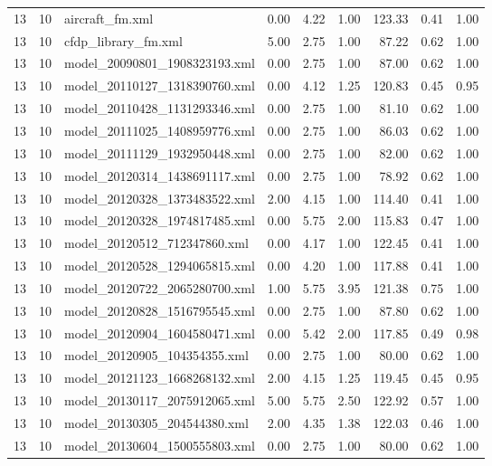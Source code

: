 \begin{table}[ht]
\begin{tabular}{rrlrrrrrr}
   13 &  10 & aircraft\_fm.xml & 0.00 & 4.22 & 1.00 & 123.33 & 0.41 & 1.00 \\ 
   13 &  10 & cfdp\_library\_fm.xml & 5.00 & 2.75 & 1.00 & 87.22 & 0.62 & 1.00 \\ 
   13 &  10 & model\_20090801\_1908323193.xml & 0.00 & 2.75 & 1.00 & 87.00 & 0.62 & 1.00 \\ 
   13 &  10 & model\_20110127\_1318390760.xml & 0.00 & 4.12 & 1.25 & 120.83 & 0.45 & 0.95 \\ 
   13 &  10 & model\_20110428\_1131293346.xml & 0.00 & 2.75 & 1.00 & 81.10 & 0.62 & 1.00 \\ 
   13 &  10 & model\_20111025\_1408959776.xml & 0.00 & 2.75 & 1.00 & 86.03 & 0.62 & 1.00 \\ 
   13 &  10 & model\_20111129\_1932950448.xml & 0.00 & 2.75 & 1.00 & 82.00 & 0.62 & 1.00 \\ 
   13 &  10 & model\_20120314\_1438691117.xml & 0.00 & 2.75 & 1.00 & 78.92 & 0.62 & 1.00 \\ 
   13 &  10 & model\_20120328\_1373483522.xml & 2.00 & 4.15 & 1.00 & 114.40 & 0.41 & 1.00 \\ 
   13 &  10 & model\_20120328\_1974817485.xml & 0.00 & 5.75 & 2.00 & 115.83 & 0.47 & 1.00 \\ 
   13 &  10 & model\_20120512\_712347860.xml & 0.00 & 4.17 & 1.00 & 122.45 & 0.41 & 1.00 \\ 
   13 &  10 & model\_20120528\_1294065815.xml & 0.00 & 4.20 & 1.00 & 117.88 & 0.41 & 1.00 \\ 
   13 &  10 & model\_20120722\_2065280700.xml & 1.00 & 5.75 & 3.95 & 121.38 & 0.75 & 1.00 \\ 
   13 &  10 & model\_20120828\_1516795545.xml & 0.00 & 2.75 & 1.00 & 87.80 & 0.62 & 1.00 \\ 
   13 &  10 & model\_20120904\_1604580471.xml & 0.00 & 5.42 & 2.00 & 117.85 & 0.49 & 0.98 \\ 
   13 &  10 & model\_20120905\_104354355.xml & 0.00 & 2.75 & 1.00 & 80.00 & 0.62 & 1.00 \\ 
   13 &  10 & model\_20121123\_1668268132.xml & 2.00 & 4.15 & 1.25 & 119.45 & 0.45 & 0.95 \\ 
   13 &  10 & model\_20130117\_2075912065.xml & 5.00 & 5.75 & 2.50 & 122.92 & 0.57 & 1.00 \\ 
   13 &  10 & model\_20130305\_204544380.xml & 2.00 & 4.35 & 1.38 & 122.03 & 0.46 & 1.00 \\ 
   13 &  10 & model\_20130604\_1500555803.xml & 0.00 & 2.75 & 1.00 & 80.00 & 0.62 & 1.00 \\ 

\end{tabular}
\end{table}
